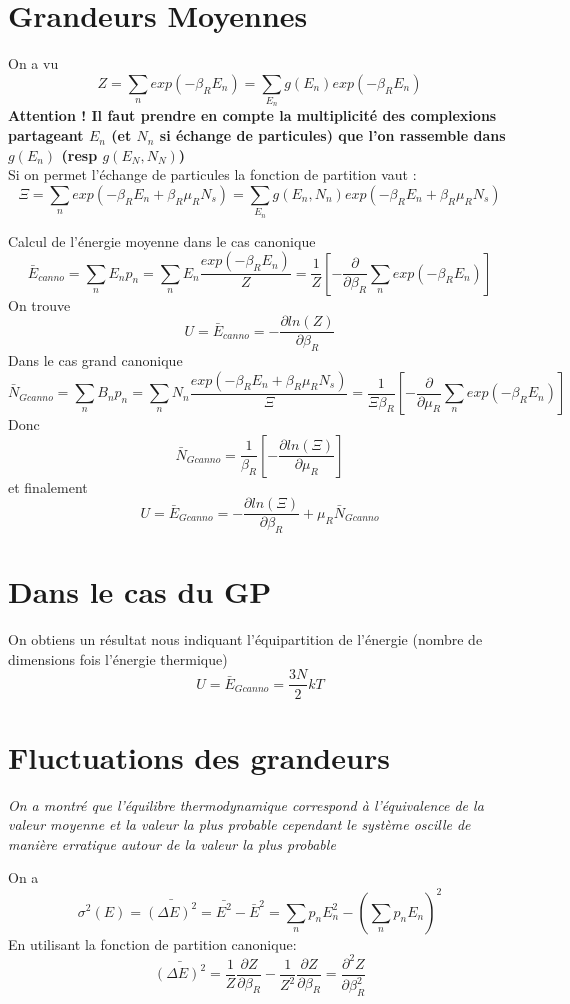 \section{Grandeurs Moyennes}


On a vu 
$$Z= \sum_n exp\left(-\beta_R E_n\right)=\sum_{E_n} g(E_n) exp(-\beta_R E_n) $$
\textbf{Attention ! Il faut prendre en compte la multiplicité des complexions partageant $E_n$ (et $N_n$ si échange de particules) que l'on rassemble dans $g(E_n)$ (resp $g(E_N,N_N)$)}
\\
Si on permet l'échange de particules la fonction de partition vaut : 
$$\Xi= \sum_n exp(-\beta_R E_n +\beta_R \mu_R N_s)=\sum_{E_n} g(E_n, N_n) exp(-\beta_R E_n +\beta_R \mu_R N_s) $$

Calcul de l'énergie moyenne dans le cas canonique
$$ \bar{E}_{canno}=\sum_nE_n p_n = \sum_n E_n \frac{exp(-\beta_R E_n)}{Z}= \frac{1}{Z} \left[- \frac{\partial}{\partial \beta_R} \sum_n exp(-\beta_R E_n)\right]$$
On trouve 
$$ U = \bar{E}_{canno} = - \frac{\partial ln(Z)}{\partial \beta_R} $$
Dans le cas grand canonique 
$$ \bar{N}_{Gcanno}=\sum_n B_n p_n = \sum_n N_n \frac{exp(-\beta_R E_n +\beta_R \mu_R N_s)}{\Xi}= \frac{1}{\Xi \beta_R} \left[- \frac{\partial}{\partial \mu_R} \sum_n exp(-\beta_R E_n)\right]$$
Donc
$$\bar{N}_{Gcanno}=\frac{1}{\beta_R} \left[- \frac{\partial ln(\Xi)}{\partial \mu_R}\right]$$
et finalement 
$$ U = \bar{E}_{Gcanno} = - \frac{\partial ln(\Xi)}{\partial \beta_R} + \mu_R \bar{N}_{Gcanno}$$


\section{Dans le cas du GP}


On obtiens un résultat nous indiquant l'équipartition de l'énergie (nombre de dimensions fois l'énergie thermique)
$$ U = \bar{E}_{Gcanno} = \frac{3N}{2}kT$$


\section{Fluctuations des grandeurs}


\textit{On a montré que l'équilibre thermodynamique correspond à l'équivalence de la valeur moyenne et la valeur la plus probable cependant le système oscille de manière erratique autour de la valeur la plus probable}

On a 
$$ \sigma^2(E)= \bar{(\Delta E)^2} =\bar{E^2}-\bar{E}^2= \sum_n p_nE_n^2 -\left(\sum_n p_n E_n\right)^2 $$
En utilisant la fonction de partition canonique:
$$\bar{(\Delta E)^2}= \frac{1}{Z} \frac{\partial Z}{\partial \beta_R}- \frac{1}{Z^2} \frac{\partial Z}{\partial \beta_R}= \frac{\partial^2 Z}{\partial \beta_R^2} $$

